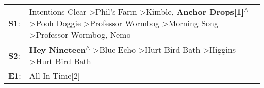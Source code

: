 \begin{supertabular}{p{0.03\textwidth}p{0.92\textwidth}}
 \textbf{S1}:  &  Intentions Clear\textsuperscript{} \textgreater \enspace Phil's Farm\textsuperscript{} \textgreater \enspace Kimble\textsuperscript{}, \enspace \textbf{Anchor Drops[1]\textsuperscript{$\wedge$}} \textgreater \enspace Pooh Doggie\textsuperscript{} \textgreater \enspace Professor Wormbog\textsuperscript{} \textgreater \enspace Morning Song\textsuperscript{} \textgreater \enspace Professor Wormbog\textsuperscript{}, \enspace Nemo\textsuperscript{}  \enspace  \\
 \textbf{S2}:  &                                                                                                                                                                                                   \textbf{Hey Nineteen\textsuperscript{$\wedge$}} \textgreater \enspace Blue Echo\textsuperscript{} \textgreater \enspace Hurt Bird Bath\textsuperscript{} \textgreater \enspace Higgins\textsuperscript{} \textgreater \enspace Hurt Bird Bath\textsuperscript{}  \enspace  \\
 \textbf{E1}:  &                                                                                                                                                                                                                                                                                                                                                                                                                                  All In Time[2]\textsuperscript{}  \enspace  \\
\end{supertabular}
